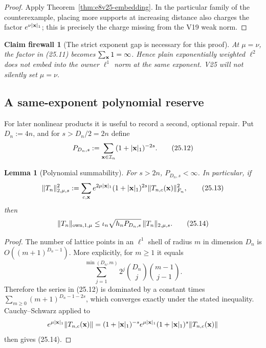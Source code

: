 \documentclass[11pt,oneside]{book}
\newtheorem{lemma}[theorem]{Lemma}
\newtheorem{firewall}[theorem]{Claim firewall}
\theoremstyle{definition}
\theoremstyle{remark}
\begin{document}
\begin{proof}
Apply Theorem~\ref{thm:e8v25-embedding}.  In the particular family of
the counterexample, placing more supports at increasing distance also
charges the factor \(e^{\nu|{\bf x}|_1}\); this is precisely the charge
missing from the V19 weak norm.
\end{proof}

\begin{firewall}[The strict exponent gap is necessary for this proof]
\label{fire:e8v25-gap}
At \(\mu=\nu\), the factor in (25.11) becomes
\(\sum_{{\bf x}}1=\infty\).  Hence plain exponentially weighted
\(\ell^2\) does not embed into the owner \(\ell^1\) norm at the same
exponent.  V25 will not silently set \(\mu=\nu\).
\end{firewall}

\subsection{A same-exponent polynomial reserve}

For later nonlinear products it is useful to record a second, optional
repair.  Put \(D_n:=4n\), and for \(s>D_n/2=2n\) define
\[
 P_{D_n,s}:=\sum_{{\bf x}\in{\cal I}_n}
                 (1+|{\bf x}|_1)^{-2s}.                           \tag{25.12}
\]

\begin{lemma}[Polynomial summability]
\label{lem:e8v25-polynomial-sum}
For \(s>2n\), \(P_{D_n,s}<\infty\).  In particular, if
\[
 \|T_n\|_{2,\mu,s}^2
 :=\sum_{c,{\bf x}}e^{2\mu|{\bf x}|_1}
       (1+|{\bf x}|_1)^{2s}\|T_{n,c}({\bf x})\|_{F_n}^2,          \tag{25.13}
\]
then
\[
 \|T_n\|_{{\rm own},1,\mu}
 \leq\iota_n\sqrt{h_nP_{D_n,s}}\,
                         \|T_n\|_{2,\mu,s}.                       \tag{25.14}
\]
\end{lemma}

\begin{proof}
The number of lattice points in an \(\ell^1\) shell of radius \(m\)
in dimension \(D_n\) is \(O((m+1)^{D_n-1})\).  More explicitly, for
\(m\geq1\) it equals
\[
 \sum_{j=1}^{\min(D_n,m)}
       2^j{D_n\choose j}{m-1\choose j-1}.                         \tag{25.15}
\]
Therefore the series in (25.12) is dominated by a constant times
\(\sum_{m\geq0}(m+1)^{D_n-1-2s}\), which converges exactly under the
stated inequality.  Cauchy--Schwarz applied to
\[
 e^{\mu|{\bf x}|_1}\|T_{n,c}({\bf x})\|
 =(1+|{\bf x}|_1)^{-s}
   e^{\mu|{\bf x}|_1}(1+|{\bf x}|_1)^s
     \|T_{n,c}({\bf x})\|
\]
then gives (25.14).
\end{proof}
\end{document}
